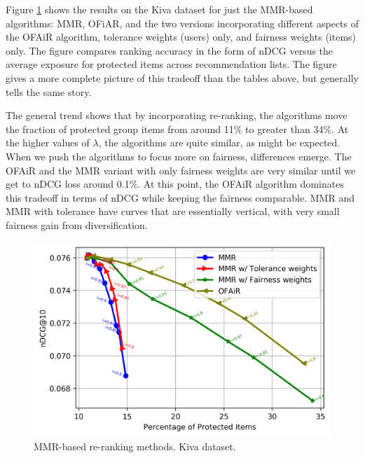 Figure \ref{fig:kiva_mmr_based_methods} shows the results on the Kiva dataset for just the MMR-based algorithms: MMR, OFiAR, and the two versions incorporating different aspects of the OFAiR algorithm, tolerance weights (users) only, and fairness weights (items) only. The figure compares ranking accuracy in the form of nDCG versus the average exposure for protected items across recommendation lists. The figure gives a more complete picture of this tradeoff than the tables above, but generally tells the same story.

The general trend shows that by incorporating re-ranking, the algorithms move the fraction of protected group items from around 11\% to greater than 34\%. At the higher values of $\lambda$, the algorithms are quite similar, as might be expected. When we push the algorithms to focus more on fairness, differences emerge. The OFAiR and the MMR variant with only fairness weights are very similar until we get to nDCG loss around 0.1\%. At this point, the OFAiR algorithm dominates this tradeoff in terms of nDCG while keeping the fairness comparable. MMR and MMR with tolerance have curves that are essentially vertical, with very small fairness gain from diversification.

\begin{figure}[tbh]
    \centering
    \includegraphics[width=\linewidth]{imgs/ofair/kiva_ndcg_itemCov_ActivityCountry_cut.png}
    \caption{MMR-based re-ranking methods. Kiva dataset.}
    \label{fig:kiva_mmr_based_methods}
\end{figure}

